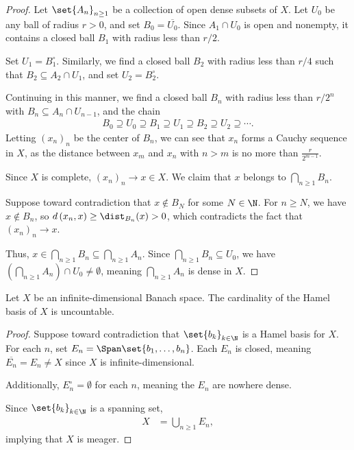\documentclass[10pt]{mypackage}
\begin{document}
\begin{proof}
  Let $\set{A_n}_{n\geq 1}$ be a collection of open dense subsets of $X$. Let $U_0$ be any ball of radius $r > 0$, and set $B_0 = \overline{U_0}$. Since $A_1\cap U_0$ is open and nonempty, it contains a closed ball $B_1$ with radius less than $r/2$.\newline

  Set $U_1 = B_1^{\circ}$. Similarly, we find a closed ball $B_2$ with radius less than $r/4$ such that $B_2\subseteq A_2\cap U_1$, and set $U_2 = B_2^{\circ}$.\newline

  Continuing in this manner, we find a closed ball $B_n$ with radius less than $r/2^n$ with $B_n \subseteq A_n\cap U_{n-1}$, and the chain
  \begin{align*}
    B_0\supseteq U_0\supseteq B_1\supseteq U_1\supseteq B_2\supseteq U_2\supseteq \cdots.
  \end{align*}
  Letting $\left(x_n\right)_n$ be the center of $B_n$, we can see that $x_n$ forms a Cauchy sequence in $X$, as the distance between $x_m$ and $x_n$ with $n > m$ is no more than $\frac{r}{2^{m-1}}$.\newline

  Since $X$ is complete, $\left(x_n\right)_n\rightarrow x\in X$. We claim that $x$ belongs to $\bigcap_{n\geq 1}B_n$.\newline

  Suppose toward contradiction that $x\notin B_{N}$ for some $N\in \N$. For $n\geq N$, we have $x\notin B_n$, so $d\left(x_n,x\right) \geq \dist_{B_n}(x) > 0$, which contradicts the fact that $\left(x_n\right)_n\rightarrow x$.\newline
  
  Thus, $x\in \bigcap_{n\geq 1}B_n\subseteq \bigcap_{n\geq 1}A_n$. Since $\bigcap_{n\geq 1}B_n\subseteq U_0$, we have $\left(\bigcap_{n\geq 1}A_n\right)\cap U_0 \neq \emptyset$, meaning $\bigcap_{n\geq 1}A_n$ is dense in $X$.
\end{proof}
\begin{corollary}
  Let $X$ be an infinite-dimensional Banach space. The cardinality of the Hamel basis of $X$ is uncountable.
\end{corollary}
\begin{proof}
  Suppose toward contradiction that $\set{b_k}_{k\in \N}$ is a Hamel basis for $X$. For each $n$, set $E_n = \Span\set{b_1,\dots,b_n}$. Each $E_n$ is closed, meaning $\overline{E_n} = E_n \neq X$ since $X$ is infinite-dimensional.\newline

  Additionally, $E_n^{\circ} = \emptyset$ for each $n$, meaning the $E_n$ are nowhere dense.\newline

  Since $\set{b_k}_{k\in \N}$ is a spanning set,
  \begin{align*}
    X &= \bigcup_{n\geq 1}E_n,
  \end{align*}
  implying that $X$ is meager.
\end{proof}
\end{document}
